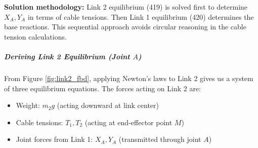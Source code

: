 \textbf{Solution methodology:} Link 2 equilibrium (419) is solved first to determine $X_A, Y_A$ in terms of cable tensions. Then Link 1 equilibrium (420) determines the base reactions. This sequential approach avoids circular reasoning in the cable tension calculations.

\subparagraph{Deriving Link 2 Equilibrium (Joint $A$)}

From Figure \ref{fig:link2_fbd}, applying Newton's laws to Link 2 gives us a system of three equilibrium equations. The forces acting on Link 2 are:
\begin{itemize}
    \item Weight: $m_2 g$ (acting downward at link center)
    \item Cable tensions: $T_1, T_2$ (acting at end-effector point $M$)
    \item Joint forces from Link 1: $X_A, Y_A$ (transmitted through joint $A$)
\end{itemize}

